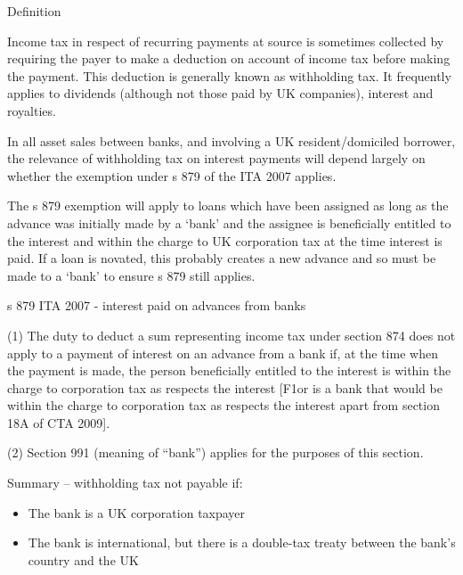 \documentclass[
]{article}
\providecommand{\tightlist}{%
  \setlength{\itemsep}{0pt}\setlength{\parskip}{0pt}}
\newenvironment{env-794f47f9-38df-4a52-b7f1-227d11939e2b}
{
    \savenotes\tcolorbox[blanker,breakable,left=5pt,borderline west={2pt}{-4pt}{green}]
}
{
    \endtcolorbox\spewnotes
}
\newenvironment{env-f09e27d9-67b8-4931-ab1f-ca6031966775}
{
    \savenotes\tcolorbox[blanker,breakable,left=5pt,borderline west={2pt}{-4pt}{yellow}]
}
{
    \endtcolorbox\spewnotes
}
\begin{document}
\begin{env-f09e27d9-67b8-4931-ab1f-ca6031966775}

Definition

Income tax in respect of recurring payments at source is sometimes
collected by requiring the payer to make a deduction on account of
income tax before making the payment. This deduction is generally known
as withholding tax. It frequently applies to dividends (although not
those paid by UK companies), interest and royalties.

\end{env-f09e27d9-67b8-4931-ab1f-ca6031966775}

In all asset sales between banks, and involving a UK resident/domiciled
borrower, the relevance of withholding tax on interest payments will
depend largely on whether the exemption under s 879 of the ITA 2007
applies.

The s 879 exemption will apply to loans which have been assigned as long
as the advance was initially made by a `bank' and the assignee is
beneficially entitled to the interest and within the charge to UK
corporation tax at the time interest is paid. If a loan is novated, this
probably creates a new advance and so must be made to a `bank' to ensure
s 879 still applies.

\begin{env-794f47f9-38df-4a52-b7f1-227d11939e2b}

s 879 ITA 2007 - interest paid on advances from banks

(1) The duty to deduct a sum representing income tax under section 874
does not apply to a payment of interest on an advance from a bank if, at
the time when the payment is made, the person beneficially entitled to
the interest is within the charge to corporation tax as respects the
interest {[}F1or is a bank that would be within the charge to
corporation tax as respects the interest apart from section 18A of CTA
2009{]}.

(2) Section 991 (meaning of ``bank'') applies for the purposes of this
section.

\end{env-794f47f9-38df-4a52-b7f1-227d11939e2b}

Summary -- withholding tax not payable if:

\begin{itemize}
\tightlist
\item
  The bank is a UK corporation taxpayer
\item
  The bank is international, but there is a double-tax treaty between
  the bank's country and the UK
\end{itemize}
\end{document}
